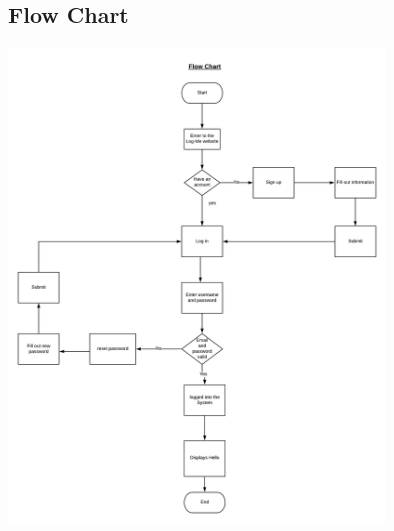 \documentclass[11pt, english]{article}
\begin{document}
\subsection{Flow Chart}
\begin{center}
\newline
\newline
\includegraphics[width=100mm,scale=7.0]{Blank Diagram.png}
\end{center}






\end{document}
